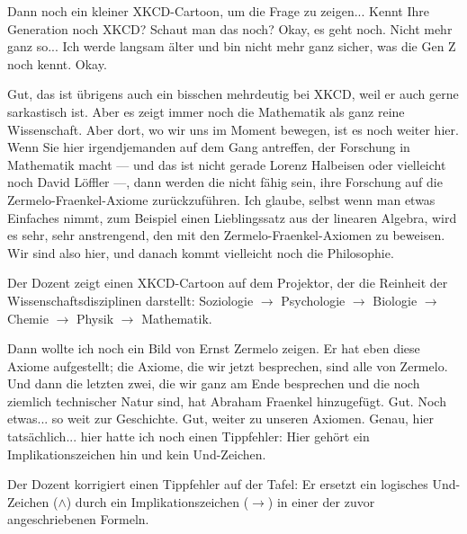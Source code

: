 \begin{spoken-clean}[00:40:53 - 00:41:07]
Dann noch ein kleiner XKCD-Cartoon, um die Frage zu zeigen... Kennt Ihre Generation noch XKCD? Schaut man das noch? Okay, es geht noch. Nicht mehr ganz so... Ich werde langsam älter und bin nicht mehr ganz sicher, was die Gen Z noch kennt. Okay.

Gut, das ist übrigens auch ein bisschen mehrdeutig bei XKCD, weil er auch gerne sarkastisch ist. Aber es zeigt immer noch die Mathematik als ganz reine Wissenschaft. Aber dort, wo wir uns im Moment bewegen, ist es noch weiter hier. Wenn Sie hier irgendjemanden auf dem Gang antreffen, der Forschung in Mathematik macht --- und das ist nicht gerade Lorenz Halbeisen oder vielleicht noch David Löffler ---, dann werden die nicht fähig sein, ihre Forschung auf die Zermelo-Fraenkel-Axiome zurückzuführen. Ich glaube, selbst wenn man etwas Einfaches nimmt, zum Beispiel einen Lieblingssatz aus der linearen Algebra, wird es sehr, sehr anstrengend, den mit den Zermelo-Fraenkel-Axiomen zu beweisen. Wir sind also hier, und danach kommt vielleicht noch die Philosophie.
\end{spoken-clean}

\begin{meta-note}
Der Dozent zeigt einen XKCD-Cartoon auf dem Projektor, der die Reinheit der Wissenschaftsdisziplinen darstellt: Soziologie $\to$ Psychologie $\to$ Biologie $\to$ Chemie $\to$ Physik $\to$ Mathematik.
\end{meta-note}

\begin{spoken-clean}[00:41:07 - 00:41:37]
Dann wollte ich noch ein Bild von Ernst Zermelo zeigen. Er hat eben diese Axiome aufgestellt; die Axiome, die wir jetzt besprechen, sind alle von Zermelo. Und dann die letzten zwei, die wir ganz am Ende besprechen und die noch ziemlich technischer Natur sind, hat Abraham Fraenkel hinzugefügt. Gut. Noch etwas... so weit zur Geschichte. Gut, weiter zu unseren Axiomen. Genau, hier tatsächlich... hier hatte ich noch einen Tippfehler: Hier gehört ein Implikationszeichen hin und kein Und-Zeichen.
\end{spoken-clean}

\begin{meta-note}[Tafelkorrektur]
Der Dozent korrigiert einen Tippfehler auf der Tafel: Er ersetzt ein logisches Und-Zeichen ($\land$) durch ein Implikationszeichen ($\rightarrow$) in einer der zuvor angeschriebenen Formeln.
\end{meta-note}

